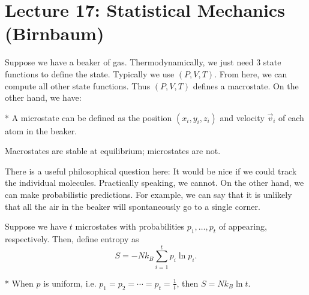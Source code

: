 \section*{Lecture 17: Statistical Mechanics (Birnbaum)}
\setcounter{section}{17}

Suppose we have a beaker of gas. Thermodynamically, we just need $3$ state functions to define the state. 
Typically we use $(P, V, T)$. From here, we can compute all other state functions.
Thus $(P, V, T)$ defines a macrostate.
On the other hand, we have:

\begin{exm}*
	A microstate can be defined as the position $(x_i, y_i, z_i)$ and velocity $\vec v_i$ of each atom in the beaker.
\end{exm}

\begin{fact}
	Macrostates are stable at equilibrium; microstates are not.
\end{fact}	

There is a useful philosophical question here: It would be nice if we could track the individual molecules. Practically speaking, we cannot. On the other hand, we can make probabilistic predictions. For example, we can say that it is unlikely that all the air in the beaker will spontaneously go to a single corner.

\begin{defn}
	Suppose we have $t$ microstates with probabilities $p_1, \ldots, p_t$ of appearing, respectively. Then, define entropy as \[
		S = -Nk_B \sum_{i=1}^t p_i \ln p_i.
	\]
\end{defn}	

\begin{fact}*
	When $p$ is uniform, i.e. $p_1 = p_2 = \cdots = p_t = \frac 1t$, then $S = Nk_B\ln t$.
\end{fact}
